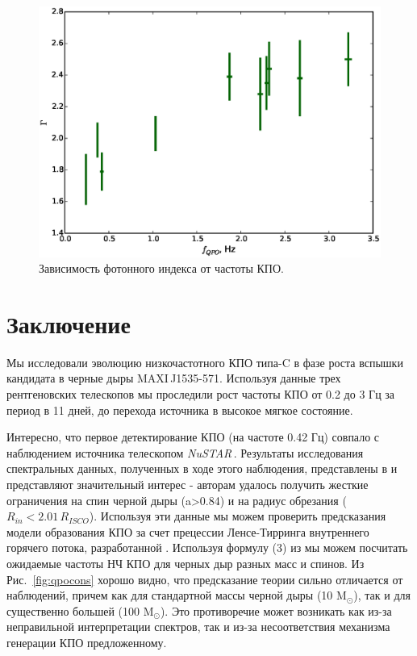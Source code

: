 \documentclass{pazhb}
\def\maxisrc{MAXI\,J1535-571}
\def\nustar{{\em NuSTAR\,}}
\begin{document}
\begin{figure}
\centerline{\includegraphics[width=\linewidth]{g_vs_f_v01.eps}}
\caption{Зависимость фотонного индекса от частоты КПО.}
\label{fig:gvsf}
\end{figure}

\section{Заключение}

Мы исследовали эволюцию низкочастотного КПО типа-C в фазе роста вспышки кандидата в черные дыры \maxisrc. Используя данные трех рентгеновских телескопов мы проследили рост частоты КПО от 0.2 до 3 Гц за период в 11 дней, до перехода источника в высокое мягкое состояние.

Интересно, что первое детектирование КПО (на частоте 0.42 Гц) совпало с наблюдением источника телескопом \nustar. Результаты исследования спектральных данных, полученных в ходе этого наблюдения, представлены в  \cite{xu17} и представляют значительный интерес - авторам удалось получить жесткие ограничения на спин черной дыры (a>0.84) и на радиус обрезания ($R_{in}<2.01\,R_{ISCO}$). Используя эти данные мы можем проверить предсказания модели образования КПО за счет прецессии Ленсе-Тирринга внутреннего горячего потока, разработанной \cite{ingram09}. Используя формулу (3) из \cite{ingram14} мы можем посчитать ожидаемые частоты НЧ КПО для черных дыр разных масс и спинов. Из Рис.~\ref{fig:qpocons} хорошо видно, что предсказание теории сильно отличается от наблюдений, причем как для стандартной массы черной дыры (10 M$_{\odot}$), так и для существенно большей (100 M$_{\odot}$). Это противоречие может возникать как из-за неправильной интерпретации спектров, так и из-за несоответствия механизма генерации КПО предложенному.
\end{document}
